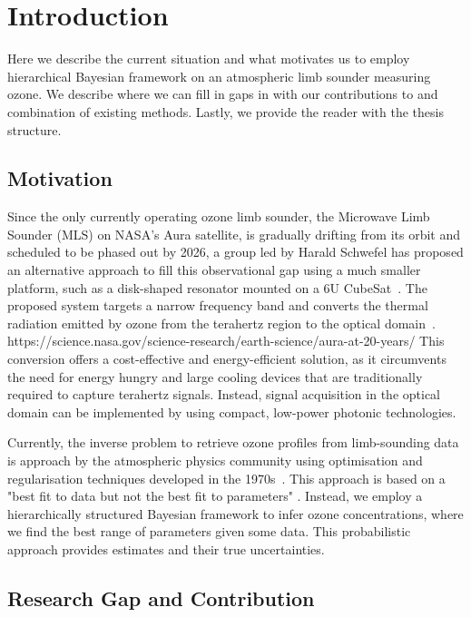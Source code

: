 \chapter{Introduction}
Here we describe the current situation and what motivates us to employ hierarchical Bayesian framework on an atmospheric limb sounder measuring ozone.
We describe where we can fill in gaps in with our contributions to and combination of existing methods.
Lastly, we provide the reader with the thesis structure.

\section{Motivation}
Since the only currently operating ozone limb sounder, the Microwave Limb Sounder (MLS) on NASA's Aura satellite, is gradually drifting from its orbit and scheduled to be phased out by 2026, a group led by Harald Schwefel has proposed an alternative approach to fill this observational gap using a much smaller platform, such as a disk-shaped resonator mounted on a 6U CubeSat~\cite{ustin2024current}. The proposed system targets a narrow frequency band and converts the thermal radiation emitted by ozone from the terahertz region to the optical domain~\cite{Suresh25,Sedlmeir14}. 
https://science.nasa.gov/science-research/earth-science/aura-at-20-years/
This conversion offers a cost-effective and energy-efficient solution, as it circumvents the need for energy hungry and large cooling devices that are traditionally required to capture terahertz signals. Instead, signal acquisition in the optical domain can be implemented by using compact, low-power photonic technologies.

Currently, the inverse problem to retrieve ozone profiles from limb-sounding data is approach by the atmospheric physics community using optimisation and regularisation techniques developed in the 1970s~\cite{rodgers1976retrieval}.
\cite{NASA2022MLSv5}
This approach is based on a "best fit to data but not the best fit to parameters" \cite{tan2016LecNot}.
Instead, we employ a hierarchically structured Bayesian framework to infer ozone concentrations, where we find the best range of parameters given some data.
This probabilistic approach provides estimates and their true uncertainties.

\section{Research Gap and Contribution}


